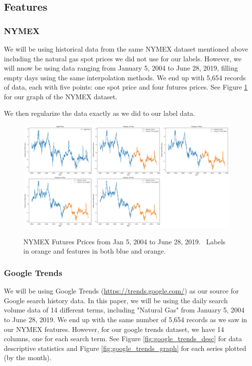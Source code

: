 \documentclass[final]{cvpr}
\begin{document}
\subsection{Features}

\subsubsection{NYMEX}

    We will be using historical data from the same NYMEX dataset mentioned above
    including the natural gas spot prices we did not use for our labels. 
    However, we will nnow be using data ranging from January 5, 2004 to June 28,
    2019, filling empty days using the same interpolation methods. We end up 
    with 5,654 records of data, each with five points: one spot price and four 
    futures prices. See Figure \ref{fig:nymex_graph} for our graph of the NYMEX 
    dataset.

    We then regularize the data exactly as we did to our label data.
    
    \begin{figure}[h]
        \caption{NYMEX Futures Prices from Jan 5, 2004 to June 28, 2019. \
            Labels in orange and features in both blue and orange.} 
        \center
        \includegraphics[width=1.0\textwidth]{images/nymex_data.png}
        \label{fig:nymex_graph}
    \end{figure}
    
\subsubsection{Google Trends}

    We will be using Google Trends (\url{https://trends.google.com/}) as our
    source for Google search history data.  In this paper, we will be using the
    daily search volume data of 14 different terms, including "Natural Gas" from
    January 5, 2004 to June 28, 2019. We end up with the same number of 5,654
    records as we saw in our NYMEX features. However, for our google trends
    dataset, we have 14 columns, one for each search term. See Figure 
    \ref{fig:google_trends_desc} for data descriptive statistics and Figure 
    \ref{fig:google_trends_graph} for each series plotted (by the month). 
    
\end{document}
